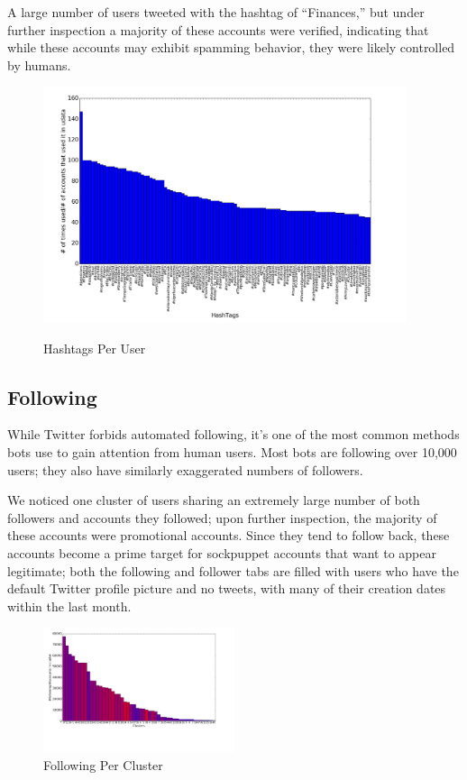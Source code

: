 \documentclass{sig-alternate-05-2015}
\begin{document}
A large number of users tweeted with the hashtag of ``Finances,'' but under further inspection a majority of these accounts were verified, indicating that while these accounts may exhibit spamming behavior, they were likely controlled by humans.

\begin{figure}[h!]
	\caption{Hashtags Per User}
	\centering
		\includegraphics[width=0.95\textwidth]{imgs/bhvc}
	\label{fig:hsh}
\end{figure}

\subsection{Following}

While Twitter forbids automated following, it's one of the most common methods bots use to gain attention from human users. Most bots are following over 10,000 users; they also have similarly exaggerated numbers of followers.

We noticed one cluster of users sharing an extremely large number of both followers and accounts they followed; upon further inspection, the majority of these accounts were promotional accounts. Since they tend to follow back, these accounts become a prime target for sockpuppet accounts that want to appear legitimate; both the following and follower tabs are filled with users who have the default Twitter profile picture and no tweets, with many of their creation dates within the last month.

\begin{figure}[h!]
	\caption{Following Per Cluster}
	\centering
		\includegraphics[width=0.5\textwidth]{imgs/following}
\end{figure}
\end{document}
